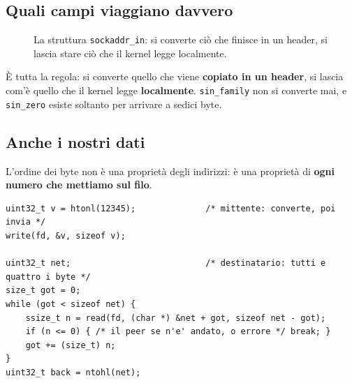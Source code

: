 \subsection{Quali campi viaggiano davvero}

\begin{figure}[H]
\centering
{}
\caption{La struttura \texttt{sockaddr\_in}: si converte ciò che finisce in un header, si lascia stare ciò che il kernel
         legge localmente.}
\end{figure}

È tutta la regola: si converte quello che viene \textbf{copiato in un header}, si lascia com'è quello che il kernel legge
\textbf{localmente}. \texttt{sin\_family} non si converte mai, e \texttt{sin\_zero} esiste soltanto per arrivare a sedici
byte.

\subsection{Anche i nostri dati}

L'ordine dei byte non è una proprietà degli indirizzi: è una proprietà di \textbf{ogni numero che mettiamo sul filo}.

\begin{lstlisting}[language={[POSIX]C}, style=wnumbers, title={Inviare e ricevere un intero di 32 bit}]
uint32_t v = htonl(12345);              /* mittente: converte, poi invia */
write(fd, &v, sizeof v);

uint32_t net;                           /* destinatario: tutti e quattro i byte */
size_t got = 0;
while (got < sizeof net) {
    ssize_t n = read(fd, (char *) &net + got, sizeof net - got);
    if (n <= 0) { /* il peer se n'e' andato, o errore */ break; }
    got += (size_t) n;
}
uint32_t back = ntohl(net);
\end{lstlisting}

